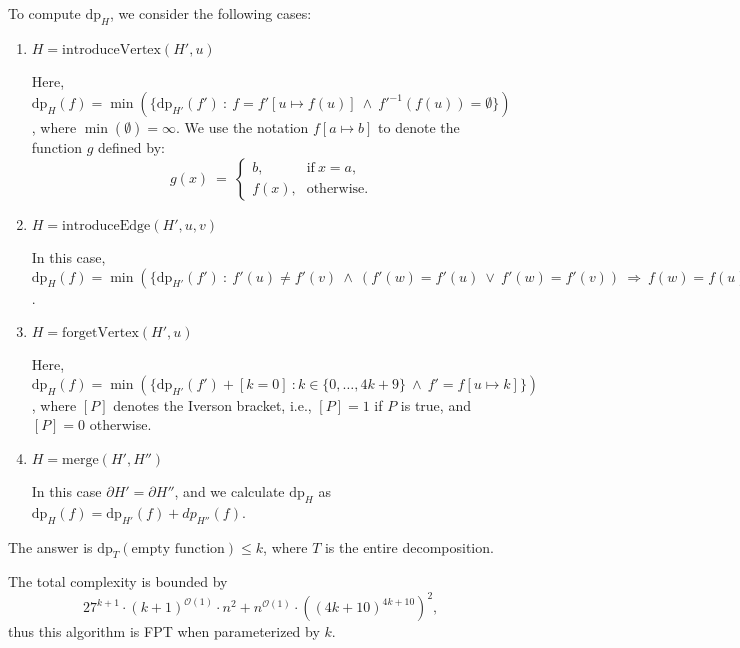 \documentclass[12pt]{article}
\begin{document}
	\medskip
	
	To compute \(\text{dp}_{H}\), we consider the following cases:
	\begin{enumerate}
		\item \(H = \text{introduceVertex}(H', u)\)
		      
		      Here, \(\text{dp}_{H}(f) = \min(\{\text{dp}_{H'}(f') \ : \ f =
		      f'[u \mapsto f(u)] \ \wedge \ f'^{-1}(f(u)) = \emptyset\})\),
		      where \(\min(\emptyset) = \infty\). We use the notation
		      \(f[a \mapsto b]\) to denote the function \(g\) defined by:
		      \[ g(x) \ = \ \begin{cases} b \text{,} & \text{if} \ x = a
		      \text{,} \\ f(x) \text{,} & \text{otherwise.} \end{cases} \]
		
		\item \(H = \text{introduceEdge}(H', u, v)\)
		      
		      In this case, \(\text{dp}_{H}(f) = \min(\{\text{dp}_{H'}(f') \ : \
		      f'(u) \neq f'(v) \ \wedge \ (f'(w) = f'(u) \ \vee \ f'(w) = f'(v))
		      \ \Rightarrow \ f(w) = f(u) = f(v)\})\).
		
		\item \(H = \text{forgetVertex}(H', u)\)
		      
		      Here, \(\text{dp}_{H}(f) = \min(\{\text{dp}_{H'}(f') + [k = 0] \ :
		      k \in \{0, \ldots, 4k + 9\} \ \wedge \ f' = f[u \mapsto k]\})\),
		      where \([P]\) denotes the Iverson bracket, i.e., \([P] = 1\) if
		      \(P\) is true, and \([P] = 0\) otherwise.
		
		\item \(H = \text{merge}(H', H'')\)
		      
		      In this case \(\partial H' = \partial H''\), and we calculate
		      \(\text{dp}_{H}\) as \(\text{dp}_{H}(f) = \text{dp}_{H'}(f) +
		      dp_{H''}(f)\).
	\end{enumerate}
	The answer is \(\text{dp}_{T}(\text{empty function}) \leqslant k\), where
	\(T\) is the entire decomposition.
	
	\medskip
	
	The total complexity is bounded by
	\[ 27^{k + 1} \cdot (k + 1)^{\mathcal{O}(1)} \cdot n^{2} +
	n^{\mathcal{O}(1)} \cdot \left( (4k + 10)^{4k + 10} \right)^{2} \text{,} \]
	thus this algorithm is FPT when parameterized by \(k\).
\end{document}
